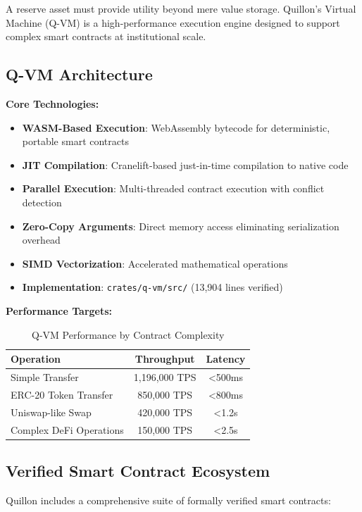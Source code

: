\documentclass[11pt,a4paper]{scrartcl}
\begin{document}
A reserve asset must provide utility beyond mere value storage. Quillon's Virtual Machine (Q-VM) is a high-performance execution engine designed to support complex smart contracts at institutional scale.

\subsection{Q-VM Architecture}

\textbf{Core Technologies:}

\begin{itemize}
\item \textbf{WASM-Based Execution}: WebAssembly bytecode for deterministic, portable smart contracts
\item \textbf{JIT Compilation}: Cranelift-based just-in-time compilation to native code
\item \textbf{Parallel Execution}: Multi-threaded contract execution with conflict detection
\item \textbf{Zero-Copy Arguments}: Direct memory access eliminating serialization overhead
\item \textbf{SIMD Vectorization}: Accelerated mathematical operations
\item \textbf{Implementation}: \texttt{crates/q-vm/src/} (13,904 lines verified)
\end{itemize}

\textbf{Performance Targets:}

\begin{table}[h]
\centering
\begin{tabular}{lcc}
\toprule
\textbf{Operation} & \textbf{Throughput} & \textbf{Latency} \\
\midrule
Simple Transfer & 1,196,000 TPS & <500ms \\
ERC-20 Token Transfer & 850,000 TPS & <800ms \\
Uniswap-like Swap & 420,000 TPS & <1.2s \\
Complex DeFi Operations & 150,000 TPS & <2.5s \\
\bottomrule
\end{tabular}
\caption{Q-VM Performance by Contract Complexity}
\end{table}

\subsection{Verified Smart Contract Ecosystem}

Quillon includes a comprehensive suite of formally verified smart contracts:
\end{document}
